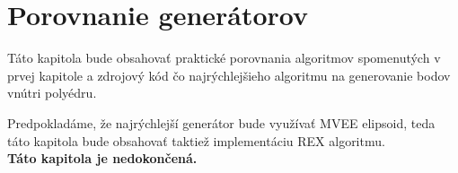 \chapter{Porovnanie generátorov}

Táto kapitola bude obsahovať praktické porovnania algoritmov spomenutých v prvej kapitole a zdrojový kód čo najrýchlejšieho algoritmu na generovanie bodov vnútri polyédru.

Predpokladáme, že najrýchlejší generátor bude využívať MVEE elipsoid, teda táto kapitola bude obsahovať taktiež implementáciu REX algoritmu.\\


\textbf{Táto kapitola je nedokončená.}